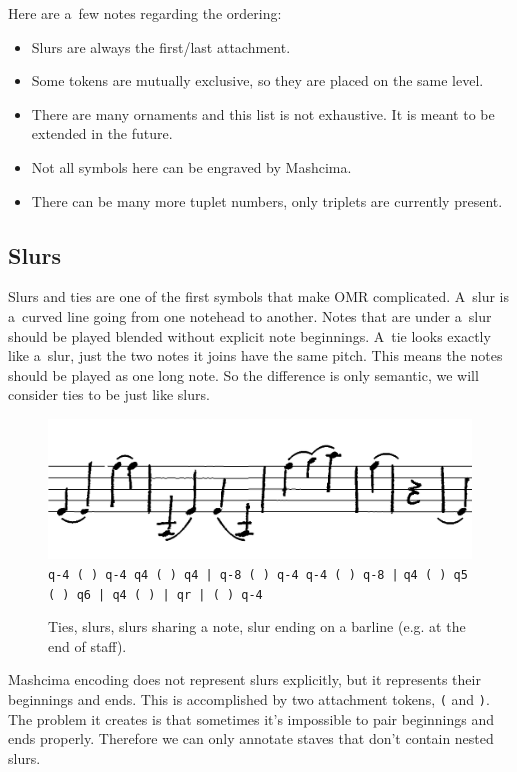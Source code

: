 Here are a~few notes regarding the ordering:

\begin{itemize}
\item Slurs are always the first/last attachment.
\item Some tokens are mutually exclusive, so they are placed on the same level.
\item There are many ornaments and this list is not exhaustive. It is meant to be extended in the future.
\item Not all symbols here can be engraved by Mashcima.
\item There can be many more tuplet numbers, only triplets are currently present.
\end{itemize}


\subsection{Slurs}
\label{sec:RepresentationSlurs}

Slurs and ties are one of the first symbols that make OMR complicated. A~slur is a~curved line going from one notehead to another. Notes that are under a~slur should be played blended without explicit note beginnings. A~tie looks exactly like a~slur, just the two notes it joins have the same pitch. This means the notes should be played as one long note. So the difference is only semantic, we will consider ties to be just like slurs.

\begin{figure}[h]
    \centering
    \includegraphics[width=140mm]{../img/slurs}
    \verb`q-4 ( ) q-4 q4 ( ) q4 | q-8 ( ) q-4 q-4 ( ) q-8 |`
    \verb`q4 ( ) q5 ( ) q6 | q4 ( ) | qr | ( ) q-4`
    \caption{Ties, slurs, slurs sharing a note, slur ending on a barline (e.g. at the end of staff).}
    \label{fig4:Slurs}
\end{figure}

Mashcima encoding does not represent slurs explicitly, but it represents their beginnings and ends. This is accomplished by two attachment tokens, \verb`(` and \verb`)`. The problem it creates is that sometimes it's impossible to pair beginnings and ends properly. Therefore we can only annotate staves that don't contain nested slurs.

